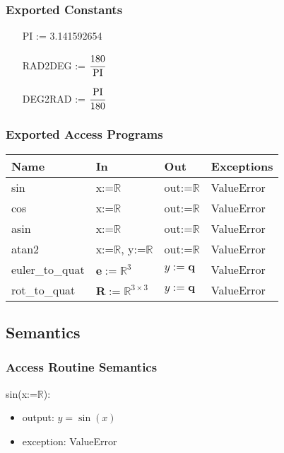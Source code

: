 \documentclass[12pt, titlepage]{article}
\begin{document}
\subsubsection{Exported Constants}
\begin{itemize}
  \item[PI] := 3.141592654
  \item[RAD2DEG] := $\cfrac{180}{\text{PI}}$
  \item[DEG2RAD] := $\cfrac{\text{PI}}{180}$
\end{itemize}


\subsubsection{Exported Access Programs}

\begin{center}
\begin{tabular}{p{2cm} p{4cm} p{4cm} p{2cm}}
\hline
\textbf{Name} & \textbf{In} & \textbf{Out} & \textbf{Exceptions} \\
\hline
sin & x:=$\mathbb{R}$ & out:=$\mathbb{R}$ & ValueError \\
cos & x:=$\mathbb{R}$ & out:=$\mathbb{R}$ & ValueError \\
asin & x:=$\mathbb{R}$ & out:=$\mathbb{R}$ & ValueError \\
atan2 & x:=$\mathbb{R}$, y:=$\mathbb{R}$ & out:=$\mathbb{R}$ & ValueError \\
euler\_to\_quat & $\mathbf{e}:=\mathbb{R}^3$& $y:=\mathbf{q}$ & ValueError \\
rot\_to\_quat & $\mathbf{R} := \mathbb{R}^{3 \times 3}$ & $y:=\mathbf{q}$ & ValueError \\
\hline
\end{tabular}
\end{center}

\subsection{Semantics}

\subsubsection{Access Routine Semantics}

\noindent sin(x:=$\mathbb{R}$):
\begin{itemize}
\item output: $y = \sin(x)$
\item exception: ValueError
\end{itemize}
\end{document}
